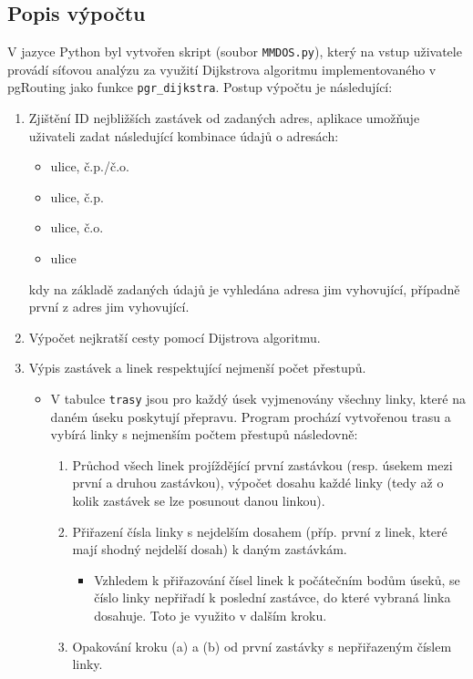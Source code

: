 \documentclass[a4paper, 12pt]{article}
\begin{document}
\subsection{Popis výpočtu}
V jazyce Python byl vytvořen skript (soubor \texttt{MMDOS.py}), který na vstup uživatele provádí síťovou analýzu za využití Dijkstrova algoritmu implementovaného v pgRouting jako funkce \texttt{pgr\_dijkstra}. Postup výpočtu je následující:
\begin{enumerate}
\item Zjištění ID nejbližších zastávek od zadaných adres, aplikace umožňuje uživateli zadat následující kombinace údajů o adresách:
	\begin{itemize}
		\item ulice, č.p./č.o.
		\item ulice, č.p.
		\item ulice, č.o.
		\item ulice
	\end{itemize}
	kdy na základě zadaných údajů je vyhledána adresa jim vyhovující, případně první z adres jim vyhovující.
\item Výpočet nejkratší cesty pomocí Dijstrova algoritmu.
\item Výpis zastávek a linek respektující nejmenší počet přestupů.
	\begin{itemize}
		\item V tabulce \texttt{trasy} jsou pro každý úsek vyjmenovány všechny linky, které na daném úseku poskytují přepravu. Program prochází vytvořenou trasu a vybírá linky s nejmenším počtem přestupů následovně:
			\begin{enumerate}
				\item Průchod všech linek projíždějící první zastávkou (resp. úsekem mezi první a druhou zastávkou), výpočet dosahu každé linky (tedy až o kolik zastávek se lze posunout danou linkou).
				\item Přiřazení čísla linky s nejdelším dosahem (příp. první z linek, které mají shodný nejdelší dosah) k daným zastávkám.
						\begin{itemize}
							\item Vzhledem k přiřazování čísel linek k počátečním bodům  úseků, se číslo linky nepřiřadí k poslední zastávce, do které vybraná linka dosahuje. Toto je využito v dalším kroku.
						\end{itemize}
				\item Opakování kroku (a) a (b) od první zastávky s nepřiřazeným číslem linky.
			\end{enumerate}
	\end{itemize}
\end{enumerate} 
\end{document}
